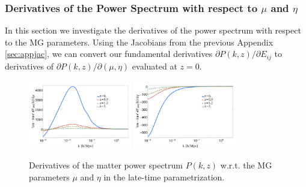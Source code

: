 \subsubsection{Derivatives of the Power Spectrum with respect to $\mu$ and $\eta$}\label{sec:appder}

In this section we investigate the derivatives of the power spectrum with respect to the MG parameters. 
Using the Jacobians from the previous Appendix \ref{sec:appjac}, we can convert 
our fundamental derivatives $\partial P(k,z)/\partial E_{ij}$ to derivatives of $\partial P(k,z)/\partial (\mu, \eta)$ evaluated at $z=0$.


\begin{figure}[htbp]
	\centering{}
	\includegraphics[width=0.4\textwidth]{Chapters/linear-nonlinear-MG-forecasts/figures/power-spectra/derivs/MGDE-Pk-wrt-mu-4z.pdf}
	\includegraphics[width=0.4\textwidth]{Chapters/linear-nonlinear-MG-forecasts/figures/power-spectra/derivs/MGDE-Pk-wrt-eta-4z.pdf}
	\caption[Derivatives of the power spectrum in the late-time parameterization.]{ Derivatives of the matter power spectrum $P(k,z)$ w.r.t. the MG parameters $\mu$ and $\eta$ in the late-time parametrization.
	}\label{fig:Pkderivs-latetime}
\end{figure}


